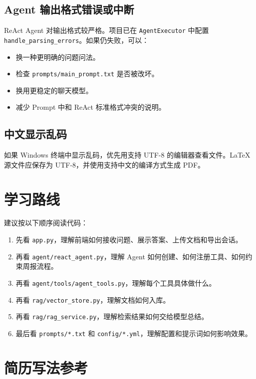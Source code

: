 \documentclass[UTF8,zihao=-4]{ctexart}
\begin{document}
\subsection{Agent 输出格式错误或中断}

ReAct Agent 对输出格式较严格。项目已在 \texttt{AgentExecutor} 中配置 \texttt{handle\_parsing\_errors}。如果仍失败，可以：

\begin{itemize}
\item 换一种更明确的问题问法。
\item 检查 \texttt{prompts/main\_prompt.txt} 是否被改坏。
\item 换用更稳定的聊天模型。
\item 减少 Prompt 中和 ReAct 标准格式冲突的说明。
\end{itemize}

\subsection{中文显示乱码}

如果 Windows 终端中显示乱码，优先用支持 UTF-8 的编辑器查看文件。LaTeX 源文件应保存为 UTF-8，并使用支持中文的编译方式生成 PDF。

\section{学习路线}

建议按以下顺序阅读代码：

\begin{enumerate}
\item 先看 \texttt{app.py}，理解前端如何接收问题、展示答案、上传文档和导出会话。
\item 再看 \texttt{agent/react\_agent.py}，理解 Agent 如何创建、如何注册工具、如何约束周报流程。
\item 再看 \texttt{agent/tools/agent\_tools.py}，理解每个工具具体做什么。
\item 再看 \texttt{rag/vector\_store.py}，理解文档如何入库。
\item 再看 \texttt{rag/rag\_service.py}，理解检索结果如何交给模型总结。
\item 最后看 \texttt{prompts/*.txt} 和 \texttt{config/*.yml}，理解配置和提示词如何影响效果。
\end{enumerate}

\section{简历写法参考}
\end{document}
